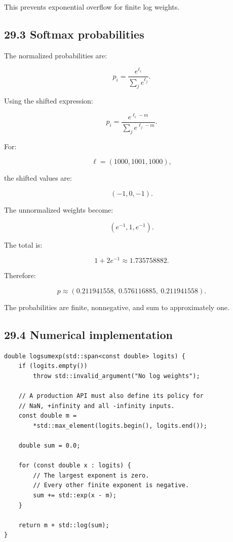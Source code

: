 This prevents exponential overflow for finite log weights.

\subsection{29.3 Softmax probabilities}\label{02-foundations-ii-ch031-softmax-probabilities}

The normalized probabilities are:

\[ \boxed{ p_i= \frac{e^{\ell_i}} {\sum_je^{\ell_j}} }. \]

Using the shifted expression:

\[ \boxed{ p_i= \frac{e^{\ell_i-m}} {\sum_je^{\ell_j-m}} }. \]

For:

\[ \ell=(1000,1001,1000), \]

the shifted values are:

\[ (-1,0,-1). \]

The unnormalized weights become:

\[ (e^{-1},1,e^{-1}). \]

The total is:

\[ 1+2e^{-1}\approx1.735758882. \]

Therefore:

\[ \boxed{ p\approx (0.211941558,\ 0.576116885,\ 0.211941558) }. \]

The probabilities are finite, nonnegative, and sum to approximately one.

\subsection{29.4 Numerical implementation}\label{02-foundations-ii-ch031-numerical-implementation}

\begin{verbatim}
double logsumexp(std::span<const double> logits) {
    if (logits.empty())
        throw std::invalid_argument("No log weights");

    // A production API must also define its policy for
    // NaN, +infinity and all -infinity inputs.
    const double m =
        *std::max_element(logits.begin(), logits.end());

    double sum = 0.0;

    for (const double x : logits) {
        // The largest exponent is zero.
        // Every other finite exponent is negative.
        sum += std::exp(x - m);
    }

    return m + std::log(sum);
}
\end{verbatim}

